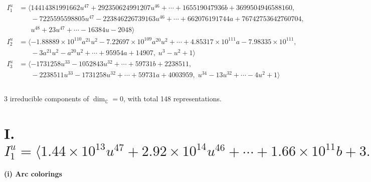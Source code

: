 \documentclass[1p]{elsarticle_modified}
\theoremstyle{definition}
\begin{document}
\begin{align*}
I^u_{1}&=\langle 
14414381991662 u^{47}+292350624991207 u^{46}+\cdots+165519047936 b+3699504946588160,\\
\phantom{I^u_{1}}&\phantom{= \langle  }-7225595598805 u^{47}-223846226739163 u^{46}+\cdots+662076191744 a+76742753642760704,\\
\phantom{I^u_{1}}&\phantom{= \langle  }u^{48}+23 u^{47}+\cdots-16384 u-2048\rangle \\
I^u_{2}&=\langle 
-1.88889\times10^{110} a^{21} u^{2}-7.22697\times10^{109} a^{20} u^{2}+\cdots+4.85317\times10^{111} a-7.98335\times10^{111},\\
\phantom{I^u_{2}}&\phantom{= \langle  }-3 a^{21} u^2- a^{20} u^2+\cdots+95954 a+14907,\;u^3- u^2+1\rangle \\
I^u_{3}&=\langle 
-1731258 u^{33}-1052843 u^{32}+\cdots+59731 b+2238511,\\
\phantom{I^u_{3}}&\phantom{= \langle  }-2238511 u^{33}-1731258 u^{32}+\cdots+59731 a+4003959,\;u^{34}-13 u^{32}+\cdots-4 u^2+1\rangle \\
\\
\end{align*}
\raggedright * 3 irreducible components of $\dim_{\mathbb{C}}=0$, with total 148 representations.\\
\newpage
\renewcommand{\arraystretch}{1}
\centering \section*{I. $I^u_{1}= \langle 1.44\times10^{13} u^{47}+2.92\times10^{14} u^{46}+\cdots+1.66\times10^{11} b+3.70\times10^{15},\;-7.23\times10^{12} u^{47}-2.24\times10^{14} u^{46}+\cdots+6.62\times10^{11} a+7.67\times10^{16},\;u^{48}+23 u^{47}+\cdots-16384 u-2048 \rangle$}
\flushleft \textbf{(i) Arc colorings}\\
\end{document}
